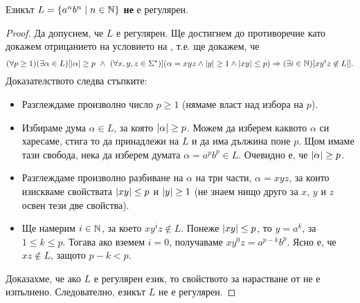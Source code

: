 \begin{example}
  Езикът $L = \{a^nb^n \mid n\in \mathbb{N}\}$ {\bf не} е регулярен.
\end{example}
\begin{proof}
  Да допуснем, че $L$ е регулярен.
  Ще достигнем до противоречие като докажем отрицанието на условието на ,
  т.е. ще докажем, че
  {\scriptsize
    \[(\forall p \geq 1)(\exists \alpha \in L)[\lvert{\alpha}\rvert \geq p\ \wedge\ (\forall x,y,z\in\Sigma^\star)[(\alpha = xyz \wedge \lvert{y}\rvert \geq 1\wedge \lvert{xy}\rvert \leq p) \Rightarrow (\exists i\in\mathbb{N})[xy^iz \not\in L]].\]}
  Доказателството следва стъпките:
  \begin{itemize}
  \item 
    Разглеждаме произволно число $p \geq 1$ (нямаме власт над избора на $p$).
  \item
    Избираме дума $\alpha \in L$, за която $\lvert{\alpha}\rvert \geq p$. Можем да изберем каквото $\alpha$
    си харесаме, стига то да принадлежи на $L$ и да има дължина поне $p$.
    Щом имаме тази свобода, нека да изберем думата $\alpha = a^pb^p \in L$. Очевидно е, че $\lvert{\alpha}\rvert \geq p$.
  \item
    Разглеждаме произволно разбиване на $\alpha$ на три части, $\alpha = xyz$,
    за които изискваме свойствата $\lvert{xy}\rvert \leq p$ и $\lvert{y}\rvert \geq 1$ (не знаем нищо друго за $x$, $y$ и $z$ освен тези две свойства).
  \item
    Ще намерим $i\in\mathbb{N}$, за което $xy^iz \not\in L$.
    Понеже $\lvert{xy}\rvert \leq p$, то $y = a^k$, за  $1\leq k \leq p$.
    Тогава ако вземем $i = 0$, получаваме $xy^0z = a^{p-k}b^p$.
    Ясно е, че $xz \not\in L$, защото $p-k < p$.
  \end{itemize}  
  Доказахме, че ако $L$ е регулярен език, то свойството за нарастване от  не е изпълнено. Следователно, езикът $L$
  не е регулярен.  
\end{proof}

